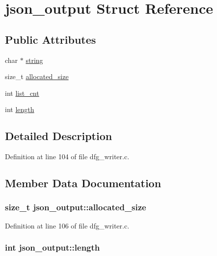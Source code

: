 \hypertarget{structjson__output}{\section{json\-\_\-output Struct Reference}
\label{structjson__output}
}
\subsection*{Public Attributes}
\begin{DoxyCompactItemize}
\item 
char $\ast$ \hyperlink{structjson__output_ab23f3314108564454074ebea87112800}{string}
\item 
size\-\_\-t \hyperlink{structjson__output_aecbcba21c9daa670feeaed052160ae88}{allocated\-\_\-size}
\item 
int \hyperlink{structjson__output_a848b0ad7bd9b43c68e4840546dd4af85}{list\-\_\-cnt}
\item 
int \hyperlink{structjson__output_a2bcea06742ddb91a63c5765a215aac6f}{length}
\end{DoxyCompactItemize}


\subsection{Detailed Description}


Definition at line 104 of file dfg\-\_\-writer.\-c.



\subsection{Member Data Documentation}
\hypertarget{structjson__output_aecbcba21c9daa670feeaed052160ae88}{
\subsubsection[{allocated\-\_\-size}]{\setlength{\rightskip}{0pt plus 5cm}size\-\_\-t json\-\_\-output\-::allocated\-\_\-size}}\label{structjson__output_aecbcba21c9daa670feeaed052160ae88}


Definition at line 106 of file dfg\-\_\-writer.\-c.

\hypertarget{structjson__output_a2bcea06742ddb91a63c5765a215aac6f}{
\subsubsection[{length}]{\setlength{\rightskip}{0pt plus 5cm}int json\-\_\-output\-::length}}\label{structjson__output_a2bcea06742ddb91a63c5765a215aac6f}


